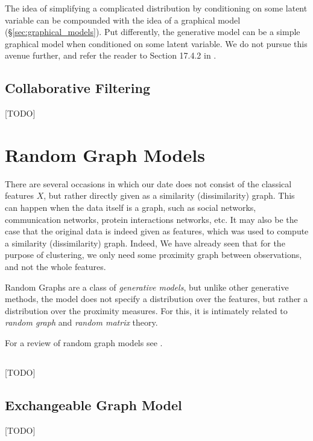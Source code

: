 The idea of simplifying a complicated distribution by conditioning on some latent variable can be compounded with the idea of a graphical model (\S\ref{sec:graphical_models}). 
Put differently, the generative model can be a simple graphical model when conditioned on some latent variable.
We do not pursue this avenue further, and refer the reader to Section 17.4.2 in \cite{hastie_elements_2003}.


\subsection{Collaborative Filtering}
\label{sec:collaborative_filtering}
[TODO]





\section{Random Graph Models}
\label{sec:random_graphs}

There are several occasions in which our date does not consist of the classical features $X$, but rather directly given as a similarity (dissimilarity) graph. This can happen when the data itself is a graph, such as social networks, communication networks, protein interactions networks, etc. It may also be the case that the original data is indeed given as features, which was used to compute a similarity (dissimilarity) graph. Indeed, We have already seen that for the purpose of clustering, we only need some proximity graph between observations, and not the whole features. 

Random Graphs are a class of \emph{generative models}, but unlike other generative methods, the model does not specify a distribution over the features, but rather a distribution over the proximity measures.
For this, it is  intimately related to \emph{random graph} and \emph{random matrix} theory.

For a review of random graph models see \cite{goldenberg_survey_2010}.


\subsection{\erdos \renyi}
[TODO]

\subsection{Exchangeable Graph Model}
[TODO]

